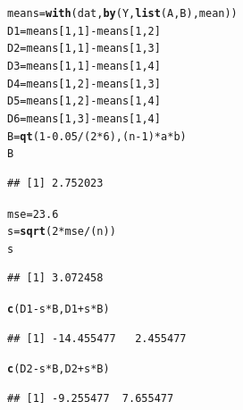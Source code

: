 \documentclass{article}\usepackage[]{graphicx}\usepackage[]{color}
\makeatletter
\newcommand{\hlnum}[1]{\textcolor[rgb]{0.686,0.059,0.569}{#1}}%
\newcommand{\hlopt}[1]{\textcolor[rgb]{0,0,0}{#1}}%
\newcommand{\hlstd}[1]{\textcolor[rgb]{0.345,0.345,0.345}{#1}}%
\newcommand{\hlkwb}[1]{\textcolor[rgb]{0.69,0.353,0.396}{#1}}%
\newcommand{\hlkwd}[1]{\textcolor[rgb]{0.737,0.353,0.396}{\textbf{#1}}}%
\newenvironment{kframe}{%
 \def\at@end@of@kframe{}%
 \ifinner\ifhmode%
  \def\at@end@of@kframe{\end{minipage}}%
  \begin{minipage}{\columnwidth}%
 \fi\fi%
 \def\FrameCommand##1{\hskip\@totalleftmargin \hskip-\fboxsep
 \colorbox{shadecolor}{##1}\hskip-\fboxsep
     \hskip-\linewidth \hskip-\@totalleftmargin \hskip\columnwidth}%
 \MakeFramed {\advance\hsize-\width
   \@totalleftmargin\z@ \linewidth\hsize
   \@setminipage}}%
 {\par\unskip\endMakeFramed%
 \at@end@of@kframe}
\newenvironment{knitrout}{}{} %
\makeatother
\begin{document}
\begin{enumerate}[(a)]
\begin{knitrout}
\color{fgcolor}\begin{kframe}
\begin{alltt}
  \hlstd{means} \hlkwb{=} \hlkwd{with}\hlstd{(dat,} \hlkwd{by}\hlstd{(Y,} \hlkwd{list}\hlstd{(A,B) , mean))}
  \hlstd{D1} \hlkwb{=} \hlstd{means[}\hlnum{1}\hlstd{,}\hlnum{1}\hlstd{]} \hlopt{-} \hlstd{means[}\hlnum{1}\hlstd{,}\hlnum{2}\hlstd{]}
  \hlstd{D2} \hlkwb{=} \hlstd{means[}\hlnum{1}\hlstd{,}\hlnum{1}\hlstd{]} \hlopt{-} \hlstd{means[}\hlnum{1}\hlstd{,}\hlnum{3}\hlstd{]}
  \hlstd{D3} \hlkwb{=} \hlstd{means[}\hlnum{1}\hlstd{,}\hlnum{1}\hlstd{]} \hlopt{-} \hlstd{means[}\hlnum{1}\hlstd{,}\hlnum{4}\hlstd{]}
  \hlstd{D4} \hlkwb{=} \hlstd{means[}\hlnum{1}\hlstd{,}\hlnum{2}\hlstd{]} \hlopt{-} \hlstd{means[}\hlnum{1}\hlstd{,}\hlnum{3}\hlstd{]}
  \hlstd{D5} \hlkwb{=} \hlstd{means[}\hlnum{1}\hlstd{,}\hlnum{2}\hlstd{]} \hlopt{-} \hlstd{means[}\hlnum{1}\hlstd{,}\hlnum{4}\hlstd{]}
  \hlstd{D6} \hlkwb{=} \hlstd{means[}\hlnum{1}\hlstd{,}\hlnum{3}\hlstd{]} \hlopt{-} \hlstd{means[}\hlnum{1}\hlstd{,}\hlnum{4}\hlstd{]}
  \hlstd{B} \hlkwb{=} \hlkwd{qt}\hlstd{(}\hlnum{1}\hlopt{-}\hlnum{0.05}\hlopt{/}\hlstd{(}\hlnum{2}\hlopt{*}\hlnum{6}\hlstd{), (n}\hlopt{-}\hlnum{1}\hlstd{)}\hlopt{*}\hlstd{a}\hlopt{*}\hlstd{b)}
  \hlstd{B}
\end{alltt}
\begin{verbatim}
## [1] 2.752023
\end{verbatim}
\begin{alltt}
  \hlstd{mse} \hlkwb{=} \hlnum{23.6}
  \hlstd{s} \hlkwb{=} \hlkwd{sqrt}\hlstd{(}\hlnum{2}\hlopt{*}\hlstd{mse}\hlopt{/}\hlstd{(n))}
  \hlstd{s}
\end{alltt}
\begin{verbatim}
## [1] 3.072458
\end{verbatim}
\begin{alltt}
  \hlkwd{c}\hlstd{(D1}\hlopt{-}\hlstd{s}\hlopt{*}\hlstd{B, D1}\hlopt{+}\hlstd{s}\hlopt{*}\hlstd{B)}
\end{alltt}
\begin{verbatim}
## [1] -14.455477   2.455477
\end{verbatim}
\begin{alltt}
  \hlkwd{c}\hlstd{(D2}\hlopt{-}\hlstd{s}\hlopt{*}\hlstd{B, D2}\hlopt{+}\hlstd{s}\hlopt{*}\hlstd{B)}
\end{alltt}
\begin{verbatim}
## [1] -9.255477  7.655477
\end{verbatim}

\end{kframe}
\end{knitrout}
\end{enumerate}
\end{document}
